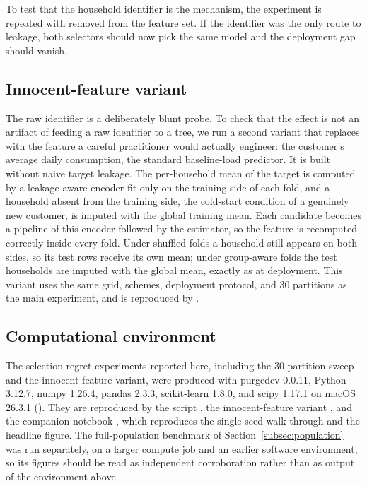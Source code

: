 \documentclass[forecasting,article,submit,oneauthor,pdftex]{Definitions/mdpi}
\newcommand{\pcv}{\textsf{purgedcv}}
\newcommand{\pkg}[1]{\textsf{#1}}
\DeclareRobustCommand{\code}[1]{\texttt{\detokenize{#1}}}
\begin{document}
To test that the household identifier is the mechanism, the experiment is
repeated with \code{hh_int} removed from the feature set. If the identifier was
the only route to leakage, both selectors should now pick the same model and the
deployment gap should vanish.

\subsection{Innocent-feature variant}

The raw identifier is a deliberately blunt probe. To check that the effect is not
an artifact of feeding a raw identifier to a tree, we run a second variant that
replaces \code{hh_int} with the feature a careful practitioner would actually
engineer: the customer's average daily consumption, the standard baseline-load
predictor. It is built without naive target leakage. The per-household mean of the
target is computed by a leakage-aware encoder fit only on the training side of
each fold, and a household absent from the training side, the cold-start
condition of a genuinely new customer, is imputed with the global training mean.
Each candidate becomes a pipeline of this encoder followed by the estimator, so
the feature is recomputed correctly inside every fold. Under shuffled folds a
household still appears on both sides, so its test rows receive its own mean;
under group-aware folds the test households are imputed with the global mean,
exactly as at deployment. This variant uses the same grid, schemes, deployment
protocol, and 30 partitions as the main experiment, and is reproduced by
.

\subsection{Computational environment}

The selection-regret experiments reported here, including the 30-partition sweep
and the innocent-feature variant, were produced with \pcv{} 0.0.11, Python 3.12.7,
\pkg{numpy} 1.26.4, \pkg{pandas} 2.3.3, \pkg{scikit-learn} 1.8.0, and \pkg{scipy}
1.17.1 on macOS 26.3.1 (\code{arm64}). They are reproduced by the script
, the innocent-feature variant
, and the companion notebook
, which reproduces the single-seed walk
through and the headline figure. The full-population benchmark of
Section~\ref{subsec:population} was run separately, on a larger compute job and an
earlier software environment, so its figures should be read as independent
corroboration rather than as output of the environment above.
\end{document}
